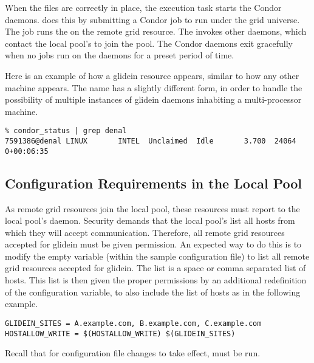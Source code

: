 When the files are correctly in place,
the execution task starts the Condor daemons.
 does this by submitting a Condor job
to run under the grid universe.
The job runs the  on the remote grid resource.
The  invokes other daemons, which contact
the local pool's  to join the pool.
The Condor daemons exit gracefully when no jobs run on the daemons for a
preset period of time.

Here is an example of how a glidein resource appears, similar to how
any other machine appears.  The name has a
slightly different form, in order to handle the possibility of
multiple instances of glidein daemons inhabiting a multi-processor
machine.

\footnotesize
\begin{verbatim}
% condor_status | grep denal
7591386@denal LINUX       INTEL  Unclaimed  Idle       3.700  24064  0+00:06:35

\end{verbatim}
\normalsize

\subsection{Configuration Requirements in the Local Pool}

As remote grid resources join the local pool,
these resources must report to the local pool's  daemon.
Security demands that the local pool's  
list all hosts from which they will accept communication.
Therefore, all remote grid resources accepted for glidein
must be given
 permission.
An expected way to do this is to modify the empty variable
(within the sample configuration file)
 to list all remote grid resources
accepted for glidein.
The list is a space or comma separated list of hosts.
This list is then given the proper permissions by an additional
redefinition of the  configuration variable,
to also include the list of hosts
as in the following example.

\footnotesize
\begin{verbatim}
GLIDEIN_SITES = A.example.com, B.example.com, C.example.com
HOSTALLOW_WRITE = $(HOSTALLOW_WRITE) $(GLIDEIN_SITES)
\end{verbatim}
\normalsize
Recall that for configuration file changes to take effect,
 must be run.

